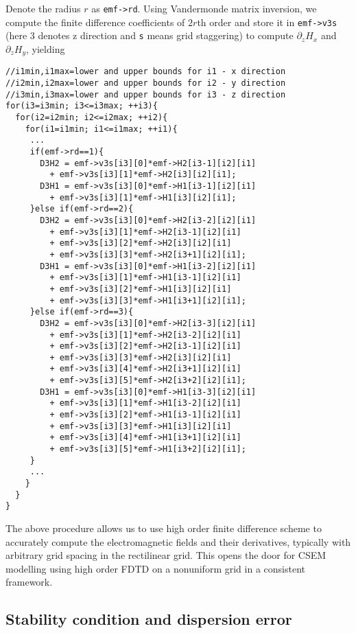 \documentclass[a4paper,10pt]{article}
\begin{document}
Denote the radius $r$ as \verb|emf->rd|. Using Vandermonde matrix inversion, we compute the finite difference coefficients of $2r$th order and store it in  \verb|emf->v3s| (here 3 denotes z direction and \verb|s| means grid staggering) to compute $\partial_z H_x$ and $\partial_z H_y$, yielding
\begin{verbatim}
//i1min,i1max=lower and upper bounds for i1 - x direction
//i2min,i2max=lower and upper bounds for i2 - y direction
//i3min,i3max=lower and upper bounds for i3 - z direction
for(i3=i3min; i3<=i3max; ++i3){
  for(i2=i2min; i2<=i2max; ++i2){
    for(i1=i1min; i1<=i1max; ++i1){
     ...
     if(emf->rd==1){
       D3H2 = emf->v3s[i3][0]*emf->H2[i3-1][i2][i1]
         + emf->v3s[i3][1]*emf->H2[i3][i2][i1];
       D3H1 = emf->v3s[i3][0]*emf->H1[i3-1][i2][i1]
         + emf->v3s[i3][1]*emf->H1[i3][i2][i1];
     }else if(emf->rd==2){
       D3H2 = emf->v3s[i3][0]*emf->H2[i3-2][i2][i1]
         + emf->v3s[i3][1]*emf->H2[i3-1][i2][i1]
         + emf->v3s[i3][2]*emf->H2[i3][i2][i1]
         + emf->v3s[i3][3]*emf->H2[i3+1][i2][i1];
       D3H1 = emf->v3s[i3][0]*emf->H1[i3-2][i2][i1]
         + emf->v3s[i3][1]*emf->H1[i3-1][i2][i1]
         + emf->v3s[i3][2]*emf->H1[i3][i2][i1]
         + emf->v3s[i3][3]*emf->H1[i3+1][i2][i1];
     }else if(emf->rd==3){
       D3H2 = emf->v3s[i3][0]*emf->H2[i3-3][i2][i1]
         + emf->v3s[i3][1]*emf->H2[i3-2][i2][i1]
         + emf->v3s[i3][2]*emf->H2[i3-1][i2][i1]
         + emf->v3s[i3][3]*emf->H2[i3][i2][i1]
         + emf->v3s[i3][4]*emf->H2[i3+1][i2][i1]
         + emf->v3s[i3][5]*emf->H2[i3+2][i2][i1];
       D3H1 = emf->v3s[i3][0]*emf->H1[i3-3][i2][i1]
         + emf->v3s[i3][1]*emf->H1[i3-2][i2][i1]
         + emf->v3s[i3][2]*emf->H1[i3-1][i2][i1]
         + emf->v3s[i3][3]*emf->H1[i3][i2][i1]
         + emf->v3s[i3][4]*emf->H1[i3+1][i2][i1]
         + emf->v3s[i3][5]*emf->H1[i3+2][i2][i1];
     }
     ...
    }
  }
}
\end{verbatim}


The above procedure allows us to use high order finite difference scheme to accurately compute the electromagnetic fields and their derivatives, typically with arbitrary grid spacing in the rectilinear grid. This opens the door for CSEM modelling using high order FDTD on a nonuniform grid in a consistent framework.


\subsection{Stability condition and dispersion error}
\end{document}

